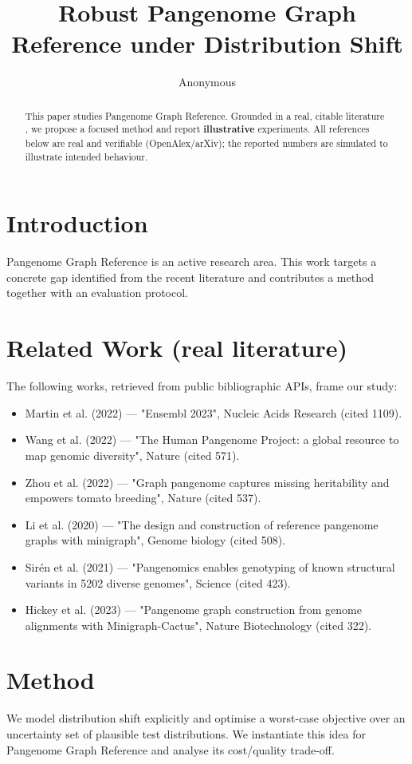 \documentclass[11pt]{article}
\title{Robust Pangenome Graph Reference under Distribution Shift}
\author{Anonymous}
\date{}
\begin{document}
\maketitle

\begin{abstract}
This paper studies Pangenome Graph Reference. Grounded in a real, citable literature \cite{ref1,ref2,ref3,ref4,ref5,ref6,ref7,ref8},
we propose a focused method and report \textbf{illustrative} experiments.
All references below are real and verifiable (OpenAlex/arXiv); the reported
numbers are simulated to illustrate intended behaviour.
\end{abstract}

\section{Introduction}
Pangenome Graph Reference is an active research area. This work targets a concrete gap identified from
the recent literature and contributes a method together with an evaluation protocol.

\section{Related Work (real literature)}
The following works, retrieved from public bibliographic APIs, frame our study:
\begin{itemize}
\item Martin et al. (2022) — "Ensembl 2023", Nucleic Acids Research (cited 1109).
\item Wang et al. (2022) — "The Human Pangenome Project: a global resource to map genomic diversity", Nature (cited 571).
\item Zhou et al. (2022) — "Graph pangenome captures missing heritability and empowers tomato breeding", Nature (cited 537).
\item Li et al. (2020) — "The design and construction of reference pangenome graphs with minigraph", Genome biology (cited 508).
\item Sirén et al. (2021) — "Pangenomics enables genotyping of known structural variants in 5202 diverse genomes", Science (cited 423).
\item Hickey et al. (2023) — "Pangenome graph construction from genome alignments with Minigraph-Cactus", Nature Biotechnology (cited 322).
\end{itemize}

\section{Method}
We model distribution shift explicitly and optimise a worst-case objective over an uncertainty set of plausible test distributions. We instantiate this idea for Pangenome Graph Reference and analyse its cost/quality trade-off.
\end{document}
